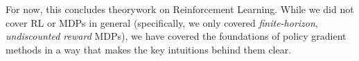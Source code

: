 \documentclass{article} %
\newtheorem{theorem}{Theorem}[section]
\begin{document}
For now, this concludes theorywork on Reinforcement Learning. 
While we did not cover RL or MDPs in general (specifically, we only covered \textit{finite-horizon}, \textit{undiscounted reward} MDPs), 
we have covered the foundations of policy gradient methods in a way that makes the key intuitions behind them clear.




\end{document}
